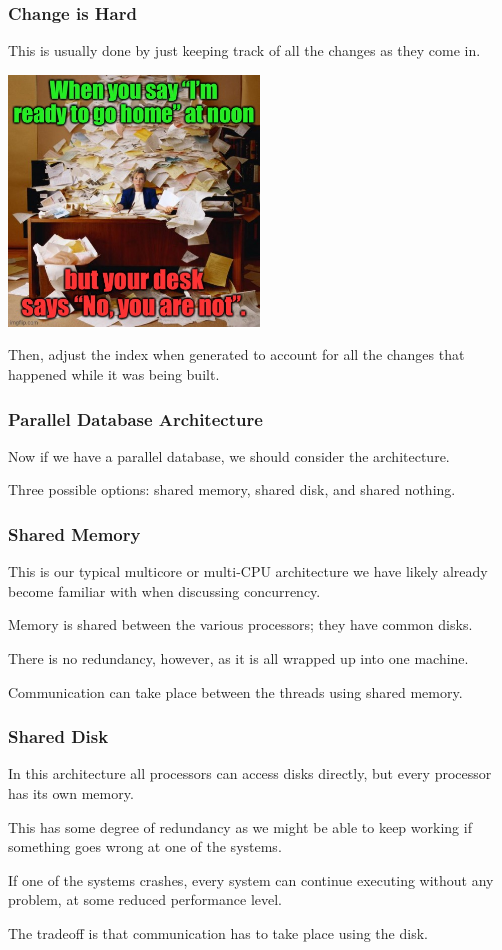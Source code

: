 \begin{frame}
\frametitle{Change is Hard}

This is usually done by just keeping track of all the changes as they come in.

\begin{center}
	\includegraphics[width=0.5\textwidth]{images/pileup.jpg}
\end{center}

Then, adjust the index when generated to account for all the changes that happened while it was being built.

\end{frame}

\begin{frame}
\frametitle{Parallel Database Architecture}

Now if we have a parallel database, we should consider the architecture. 


Three possible options: shared memory, shared disk, and shared nothing.


\end{frame}

\begin{frame}
\frametitle{Shared Memory}

This is our typical multicore or multi-CPU architecture we have likely already become familiar with when discussing concurrency. 

Memory is shared between the various processors; they have common disks. 

There is no redundancy, however, as it is all wrapped up into one machine.

Communication can take place between the threads using shared memory.

\end{frame}

\begin{frame}
\frametitle{Shared Disk}

In this architecture all processors can access disks directly, but every processor has its own memory. 

This has some degree of redundancy as we might be able to keep working if something goes wrong at one of the systems. 

If one of the systems crashes, every system can continue executing without any problem, at some reduced performance level. 

The tradeoff is that communication has to take place using the disk.

\end{frame}

